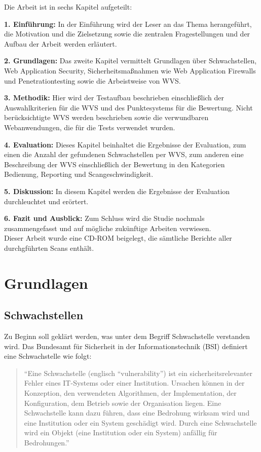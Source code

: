 \documentclass[12pt,oneside,a4paper,parskip]{scrbook}
\begin{document}
Die Arbeit ist in sechs Kapitel aufgeteilt:

\textbf{1. Einführung:} In der Einführung wird der Leser an das Thema herangeführt, die Motivation und die Zielsetzung  sowie die zentralen Fragestellungen und der Aufbau der Arbeit werden erläutert.

\textbf{2. Grundlagen:} Das zweite Kapitel vermittelt Grundlagen über Schwachstellen, Web Application Security, Sicherheitsmaßnahmen wie Web Application Firewalls und Penetrationtesting sowie die Arbeistweise von WVS.

\textbf{3. Methodik:} Hier wird der Testaufbau beschrieben einschließlich der Auswahlkriterien für die WVS und des Punktesystems für die Bewertung. Nicht berücksichtigte WVS werden beschrieben sowie die verwundbaren Webanwendungen, die für die Tests verwendet wurden.

\textbf{4. Evaluation:} Dieses Kapitel beinhaltet die Ergebnisse der Evaluation, zum einen die Anzahl der gefundenen Schwachstellen per WVS, zum anderen eine Beschreibung der WVS einschließlich der Bewertung in den Kategorien Bedienung, Reporting und Scangeschwindigkeit.

\textbf{5. Diskussion:} In diesem Kapitel werden die Ergebnisse der Evaluation durchleuchtet und erörtert.

\textbf{6. Fazit und Ausblick:} Zum Schluss wird die Studie nochmals zusammengefasst und auf mögliche zukünftige Arbeiten verwiesen.\\

Dieser Arbeit wurde eine CD-ROM beigelegt, die sämtliche Berichte aller durchgführten Scans enthält.

\chapter{Grundlagen}
  \section{Schwachstellen}
  Zu Beginn soll geklärt werden, was unter dem Begriff Schwachstelle verstanden wird. Das Bundesamt für Sicherheit in der Informationstechnik (BSI) definiert eine Schwachstelle wie folgt:

  \begin{quote}``Eine Schwachstelle (englisch ``vulnerability'') ist ein sicherheitsrelevanter Fehler eines IT-Systems oder einer Institution. Ursachen können in der Konzeption, den verwendeten Algorithmen, der Implementation, der Konfiguration, dem Betrieb sowie der Organisation liegen. Eine Schwachstelle kann dazu führen, dass eine Bedrohung wirksam wird und eine Institution oder ein System geschädigt wird. Durch eine Schwachstelle wird ein Objekt (eine Institution oder ein System) anfällig für Bedrohungen.'' \cite{BSI2}
  \end{quote}
\end{document}
